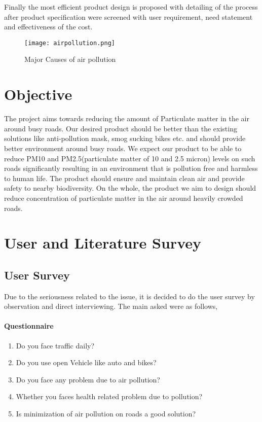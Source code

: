 \documentclass[12pt]{article}
\begin{document}
Finally the most efficient product design is proposed with detailing of the process after product specification were screened with user requirement, need statement and effectiveness of the cost. \\

\begin{figure}[!htb]
\centering
\texttt{[image: airpollution.png]}
\caption{\label{fig:}Major Causes of air pollution}
\end{figure}

\newpage

\section{Objective}

\label{sec:examples}

The project aims towards reducing the amount of Particulate matter in the air around busy roads. Our desired product should be better than the existing solutions like anti-pollution mask, smog sucking bikes etc. and should provide better environment around busy roads. We expect our product to be able to reduce PM10 and PM2.5(particulate matter of 10 and 2.5 micron) levels on such roads significantly resulting in an environment that is pollution free and harmless to human life. The product should ensure and maintain clean air and provide safety to nearby biodiversity. On the whole, the product we aim to design should reduce concentration of particulate matter in the air around heavily crowded roads.

\newpage

\section{User and Literature Survey}

\subsection{User Survey}

Due to the seriousness related to the issue, it is decided to do the user survey by observation and direct interviewing. The main asked were as follows, 

\paragraph{Questionnaire}
\begin{enumerate}
\item Do you face traffic daily?
\item Do you use open Vehicle like auto and bikes?
\item Do you face any problem due to air pollution?
\item Whether you faces health related problem due to pollution?\item Is minimization of air pollution on roads a good solution?
\end{enumerate}
\end{document}
